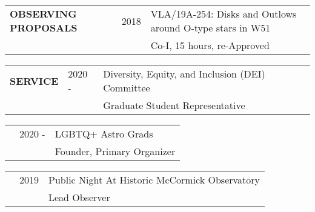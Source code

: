 \documentclass{article}
\begin{document}
\begin{tabular}{p{4cm}p{2.2cm}l}
    \large{\textbf{OBSERVING \newline PROPOSALS}} & 2018 & VLA/19A-254: Disks and Outlows around O-type stars in W51 \vspace{-0.45cm}\\
     & & \small Co-I, 15 hours, re-Approved \\
\end{tabular}
\vspace{0.5cm}


\begin{tabular}{p{4cm}p{2.2cm}l}
    \large{\textbf{SERVICE}} & 2020 - & Diversity, Equity, and Inclusion (DEI) Committee  \\
                 & & \small Graduate Student Representative
\end{tabular}


\vspace{0.25cm}
\begin{tabular}{p{4cm}p{2.2cm}l}
    &2020 - & LGBTQ+ Astro Grads \\
    &             & \small Founder, Primary Organizer
\end{tabular}


\vspace{0.25cm}
\begin{tabular}{p{4cm}p{2.2cm}l}
    &2019 & Public Night At Historic McCormick Observatory \\
    &             & \small Lead Observer
\end{tabular}

\end{document}
